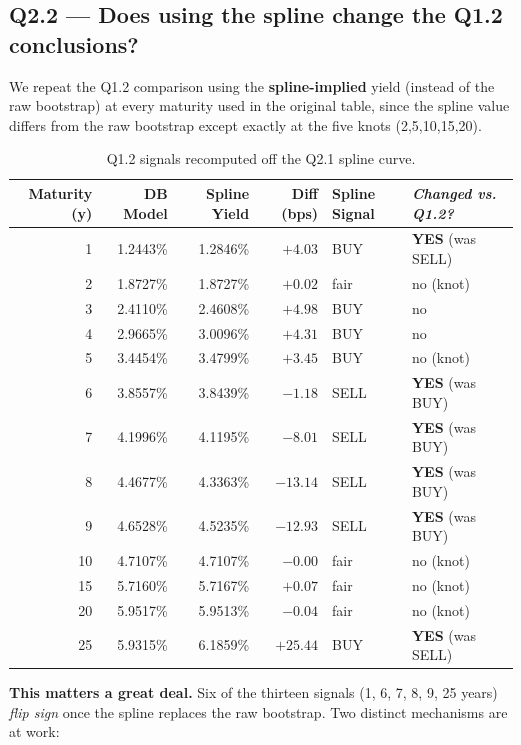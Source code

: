 \documentclass[11pt]{article}
\newcommand{\question}[1]{\subsection*{\textcolor{edhecred}{#1}}}
\begin{document}
\question{Q2.2 --- Does using the spline change the Q1.2 conclusions?}

We repeat the Q1.2 comparison using the \textbf{spline-implied} yield
(instead of the raw bootstrap) at every maturity used in the original
table, since the spline value differs from the raw bootstrap except
exactly at the five knots (2,5,10,15,20).

\begin{table}[h]
\centering
\small
\begin{tabular}{rrrrll}
\toprule
Maturity (y) & DB Model & Spline Yield & Diff (bps) & Spline Signal & \textit{Changed vs. Q1.2?} \\
\midrule
1  & 1.2443\% & 1.2846\% & $+4.03$  & BUY  & \textbf{YES} (was SELL) \\
2  & 1.8727\% & 1.8727\% & $+0.02$  & fair & no (knot) \\
3  & 2.4110\% & 2.4608\% & $+4.98$  & BUY  & no \\
4  & 2.9665\% & 3.0096\% & $+4.31$  & BUY  & no \\
5  & 3.4454\% & 3.4799\% & $+3.45$  & BUY  & no (knot) \\
6  & 3.8557\% & 3.8439\% & $-1.18$  & SELL & \textbf{YES} (was BUY) \\
7  & 4.1996\% & 4.1195\% & $-8.01$  & SELL & \textbf{YES} (was BUY) \\
8  & 4.4677\% & 4.3363\% & $-13.14$ & SELL & \textbf{YES} (was BUY) \\
9  & 4.6528\% & 4.5235\% & $-12.93$ & SELL & \textbf{YES} (was BUY) \\
10 & 4.7107\% & 4.7107\% & $-0.00$  & fair & no (knot) \\
15 & 5.7160\% & 5.7167\% & $+0.07$  & fair & no (knot) \\
20 & 5.9517\% & 5.9513\% & $-0.04$  & fair & no (knot) \\
25 & 5.9315\% & 6.1859\% & $+25.44$ & BUY  & \textbf{YES} (was SELL) \\
\bottomrule
\end{tabular}
\caption{Q1.2 signals recomputed off the Q2.1 spline curve.}
\end{table}

\textbf{This matters a great deal.} Six of the thirteen signals (1, 6, 7, 8,
9, 25 years) \emph{flip sign} once the spline replaces the raw bootstrap.
Two distinct mechanisms are at work:
\end{document}
